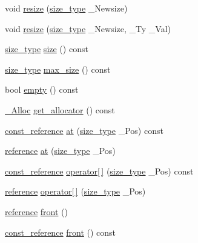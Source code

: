 \begin{DoxyCompactItemize}
void \hyperlink{classvector_aa98dbcc4560cd1171d5d6d23567e8d53}{resize} (\hyperlink{classvector_ac975e84f5d6c2fe2267bb354a85818af}{size\+\_\+type} \+\_\+\+Newsize)
\item 
void \hyperlink{classvector_a7bc8f8fd18dfea8648036ba31f616386}{resize} (\hyperlink{classvector_ac975e84f5d6c2fe2267bb354a85818af}{size\+\_\+type} \+\_\+\+Newsize, \+\_\+\+Ty \+\_\+\+Val)
\item 
\hyperlink{classvector_ac975e84f5d6c2fe2267bb354a85818af}{size\+\_\+type} \hyperlink{classvector_a1f753ec0d05eadcb7fc18617ea54a82b}{size} () const 
\item 
\hyperlink{classvector_ac975e84f5d6c2fe2267bb354a85818af}{size\+\_\+type} \hyperlink{classvector_a0002515b016b6ea9ba25902c44ec7b1a}{max\+\_\+size} () const 
\item 
bool \hyperlink{classvector_a8aa620f8d84b5a9b2279d0956039da25}{empty} () const 
\item 
\hyperlink{classvector_af95a9863612fdd67572c39c825c5aee6}{\+\_\+\+Alloc} \hyperlink{classvector_a0ee6657761474e25e5d0c33926b1f7f7}{get\+\_\+allocator} () const 
\item 
\hyperlink{classvector_a22ae7381c38ba94955ba45177b24a51f}{const\+\_\+reference} \hyperlink{classvector_abb4ef2cdcb5fe5fd4f67abbf4135765c}{at} (\hyperlink{classvector_ac975e84f5d6c2fe2267bb354a85818af}{size\+\_\+type} \+\_\+\+Pos) const 
\item 
\hyperlink{classvector_a68d6b0f887c9e4d0f422a1e3900b9794}{reference} \hyperlink{classvector_af83e91556a8a2ea79e558c8d62bd442b}{at} (\hyperlink{classvector_ac975e84f5d6c2fe2267bb354a85818af}{size\+\_\+type} \+\_\+\+Pos)
\item 
\hyperlink{classvector_a22ae7381c38ba94955ba45177b24a51f}{const\+\_\+reference} \hyperlink{classvector_aa364f7385b52acc5e9931fb1e9af09d7}{operator\mbox{[}$\,$\mbox{]}} (\hyperlink{classvector_ac975e84f5d6c2fe2267bb354a85818af}{size\+\_\+type} \+\_\+\+Pos) const 
\item 
\hyperlink{classvector_a68d6b0f887c9e4d0f422a1e3900b9794}{reference} \hyperlink{classvector_a193ab55a199d22c1f47c190343a535fa}{operator\mbox{[}$\,$\mbox{]}} (\hyperlink{classvector_ac975e84f5d6c2fe2267bb354a85818af}{size\+\_\+type} \+\_\+\+Pos)
\item 
\hyperlink{classvector_a68d6b0f887c9e4d0f422a1e3900b9794}{reference} \hyperlink{classvector_a327ba92b9bf6c74429a6671a727913cd}{front} ()
\item 
\hyperlink{classvector_a22ae7381c38ba94955ba45177b24a51f}{const\+\_\+reference} \hyperlink{classvector_abc308a2e916ff33162db56d0673a0ea0}{front} () const 

\end{DoxyCompactItemize}
